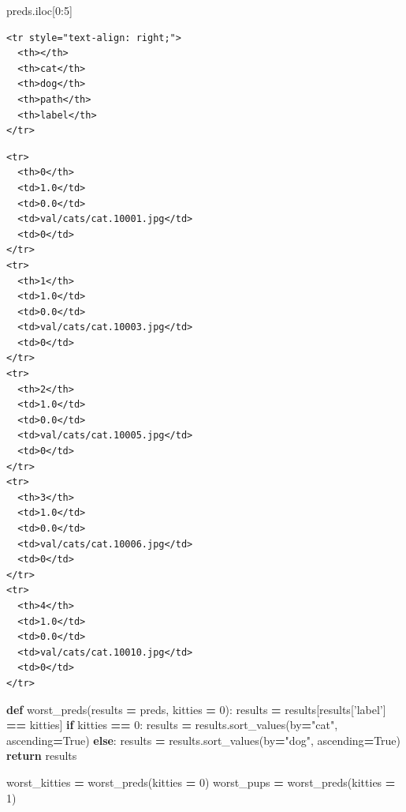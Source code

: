 \documentclass[]{book}
\newenvironment{Shaded}{\begin{snugshade}}{\end{snugshade}}
\newcommand{\KeywordTok}[1]{\textcolor[rgb]{0.13,0.29,0.53}{\textbf{#1}}}
\newcommand{\DecValTok}[1]{\textcolor[rgb]{0.00,0.00,0.81}{#1}}
\newcommand{\StringTok}[1]{\textcolor[rgb]{0.31,0.60,0.02}{#1}}
\newcommand{\VariableTok}[1]{\textcolor[rgb]{0.00,0.00,0.00}{#1}}
\newcommand{\ControlFlowTok}[1]{\textcolor[rgb]{0.13,0.29,0.53}{\textbf{#1}}}
\newcommand{\OperatorTok}[1]{\textcolor[rgb]{0.81,0.36,0.00}{\textbf{#1}}}
\newcommand{\NormalTok}[1]{#1}
\theoremstyle{definition}
\theoremstyle{definition}
\theoremstyle{definition}
\theoremstyle{remark}
\begin{document}
\begin{Shaded}
\begin{Highlighting}[]
\NormalTok{preds.iloc[}\DecValTok{0}\NormalTok{:}\DecValTok{5}\NormalTok{]}
\end{Highlighting}
\end{Shaded}

\begin{verbatim}
<tr style="text-align: right;">
  <th></th>
  <th>cat</th>
  <th>dog</th>
  <th>path</th>
  <th>label</th>
</tr>
\end{verbatim}

\begin{verbatim}
<tr>
  <th>0</th>
  <td>1.0</td>
  <td>0.0</td>
  <td>val/cats/cat.10001.jpg</td>
  <td>0</td>
</tr>
<tr>
  <th>1</th>
  <td>1.0</td>
  <td>0.0</td>
  <td>val/cats/cat.10003.jpg</td>
  <td>0</td>
</tr>
<tr>
  <th>2</th>
  <td>1.0</td>
  <td>0.0</td>
  <td>val/cats/cat.10005.jpg</td>
  <td>0</td>
</tr>
<tr>
  <th>3</th>
  <td>1.0</td>
  <td>0.0</td>
  <td>val/cats/cat.10006.jpg</td>
  <td>0</td>
</tr>
<tr>
  <th>4</th>
  <td>1.0</td>
  <td>0.0</td>
  <td>val/cats/cat.10010.jpg</td>
  <td>0</td>
</tr>
\end{verbatim}

\begin{Shaded}
\begin{Highlighting}[]
\KeywordTok{def}\NormalTok{ worst_preds(results }\OperatorTok{=}\NormalTok{ preds,}
\NormalTok{               kitties }\OperatorTok{=} \DecValTok{0}\NormalTok{):}
\NormalTok{    results }\OperatorTok{=}\NormalTok{ results[results[}\StringTok{'label'}\NormalTok{] }\OperatorTok{==}\NormalTok{ kitties]}
    \ControlFlowTok{if}\NormalTok{ kitties }\OperatorTok{==} \DecValTok{0}\NormalTok{:}
\NormalTok{        results }\OperatorTok{=}\NormalTok{ results.sort_values(by}\OperatorTok{=}\StringTok{"cat"}\NormalTok{, ascending}\OperatorTok{=}\VariableTok{True}\NormalTok{)}
    \ControlFlowTok{else}\NormalTok{:}
\NormalTok{        results }\OperatorTok{=}\NormalTok{ results.sort_values(by}\OperatorTok{=}\StringTok{"dog"}\NormalTok{, ascending}\OperatorTok{=}\VariableTok{True}\NormalTok{)}
    \ControlFlowTok{return}\NormalTok{ results}
\end{Highlighting}
\end{Shaded}

\begin{Shaded}
\begin{Highlighting}[]
\NormalTok{worst_kitties }\OperatorTok{=}\NormalTok{ worst_preds(kitties }\OperatorTok{=} \DecValTok{0}\NormalTok{)}
\NormalTok{worst_pups }\OperatorTok{=}\NormalTok{ worst_preds(kitties }\OperatorTok{=} \DecValTok{1}\NormalTok{)}
\end{Highlighting}
\end{Shaded}
\end{document}
